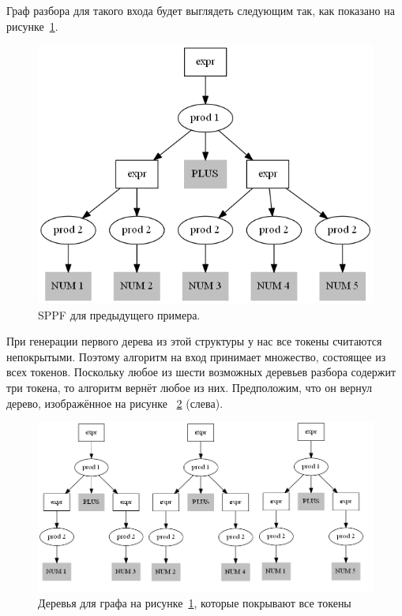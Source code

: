 Граф разбора для такого входа будет выглядеть следующим так, как показано на рисунке~\ref{illustration_sppf}.

\begin{figure}[t]
\centering
\includegraphics[width=\linewidth]{Ivanov/Pictures/illustration_sppf.png}
\caption{SPPF для предыдущего примера.}
\label{illustration_sppf}
\end{figure}

При генерации первого дерева из этой структуры у нас все токены считаются непокрытыми. Поэтому алгоритм на вход принимает множество, состоящее из всех токенов. Поскольку любое из шести возможных деревьев разбора содержит три токена, то алгоритм вернёт любое из них. Предположим, что он вернул дерево, изображённое на рисунке ~\ref{forest} (слева). 

\begin{figure}[t]
    \centering
    \includegraphics[width=\linewidth]{Ivanov/Pictures/illustration_forest.png}
    \caption{Деревья для графа на рисунке~\ref{illustration_sppf}, которые покрывают все токены}
    \label{forest}
\end{figure}

